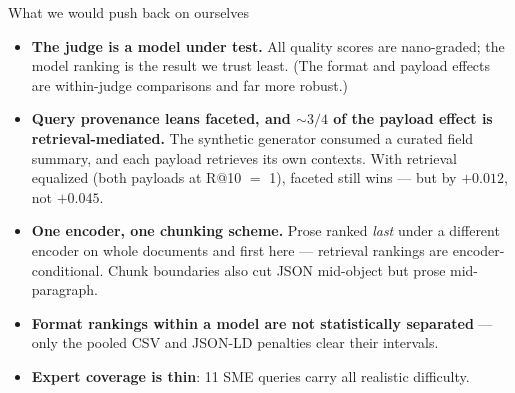 \documentclass[aspectratio=169,10pt]{beamer}
\newcommand{\muted}[1]{\textcolor{inksec}{#1}}
\begin{document}
\begin{frame}{What we would push back on ourselves}
  \begin{itemize}
    \item \textbf{The judge is a model under test.} All quality scores are nano-graded;
      the model ranking is the result we trust least. \muted{(The format and payload effects are
      within-judge comparisons and far more robust.)}
    \item \textbf{Query provenance leans faceted, and ${\sim}3/4$ of the payload effect is
      retrieval-mediated.} The synthetic generator consumed a curated field summary, and each
      payload retrieves its own contexts. \muted{With retrieval equalized (both payloads at
      R@10 $=$ 1), faceted still wins --- but by $+0.012$, not $+0.045$.}
    \item \textbf{One encoder, one chunking scheme.} Prose ranked \textit{last} under a different
      encoder on whole documents and first here --- retrieval rankings are
      encoder-conditional. \muted{Chunk boundaries also cut JSON mid-object but prose mid-paragraph.}
    \item \textbf{Format rankings within a model are not statistically separated} --- only the
      pooled CSV and JSON-LD penalties clear their intervals.
    \item \textbf{Expert coverage is thin}: 11 SME queries carry all realistic difficulty.
  \end{itemize}
\end{frame}
\end{document}
